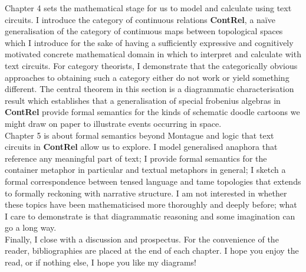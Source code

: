 Chapter 4 sets the mathematical stage for us to model and calculate using text circuits. I introduce the category of continuous relations \textbf{ContRel}, a na\"{i}ve generalisation of the category of continuous maps between topological spaces which I introduce for the sake of having a sufficiently expressive and cognitively motivated concrete mathematical domain in which to interpret and calculate with text circuits. For category theorists, I demonstrate that the categorically obvious approaches to obtaining such a category either do not work or yield something different. The central theorem in this section is a diagrammatic characterisation result which establishes that a generalisation of special frobenius algebras in \textbf{ContRel} provide formal semantics for the kinds of schematic doodle cartoons we might draw on paper to illustrate events occurring in space.\\

Chapter 5 is about formal semantics beyond Montague and logic that text circuits in \textbf{ContRel} allow us to explore. I model generalised anaphora that reference any meaningful part of text; I provide formal semantics for the container metaphor in particular and textual metaphors in general; I sketch a formal correspondence between tensed language and tame topologies that extends to formally reckoning with narrative structure. I am not interested in whether these topics have been mathematicised more thoroughly and deeply before; what I care to demonstrate is that diagrammatic reasoning and some imagination can go a long way.\\

Finally, I close with a discussion and prospectus. For the convenience of the reader, bibliographies are placed at the end of each chapter. I hope you enjoy the read, or if nothing else, I hope you like my diagrams!
